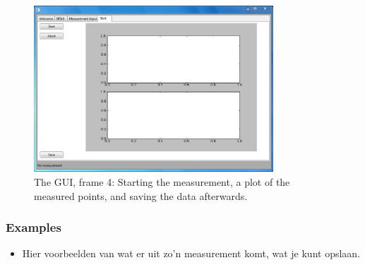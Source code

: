 \begin{figure}[!ht]
 \begin{center}
  \includegraphics[width=0.8\textwidth]{figures/gui4}
  \caption{The GUI, frame 4: Starting the measurement, a plot of the measured points, and saving the data afterwards.}
  \label{fig:gui4}
 \end{center}
\end{figure}

\subsubsection{Examples}
\begin{itemize}
 \item Hier voorbeelden van wat er uit zo'n measurement komt, wat je kunt opslaan.
\end{itemize}
